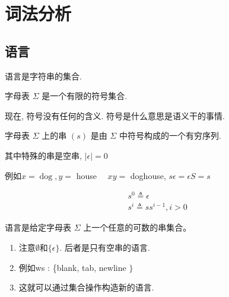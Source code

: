 \documentclass{ctexart}
\begin{document}
\section{词法分析}

\subsection{语言}

语言是字符串的集合. 

\begin{definition}[字母表]
    字母表 $\Sigma$ 是一个有限的符号集合. 
\end{definition}

现在, 符号没有任何的含义. 符号是什么意思是语义干的事情. 

\begin{definition}[字母表]
    字母表 $\Sigma$ 上的串 $(s)$ 是由 $\Sigma$ 中符号构成的一个有穷序列.
\end{definition}

其中特殊的串是空串, $|\epsilon|=0$

\begin{definition}[串上的连接运算]
    例如$x=\operatorname{dog}, y=$ house $\quad x y=$ doghouse, $s \epsilon=\epsilon S=s$
\end{definition}

\begin{definition}[串上的指数运算]
    $$
\begin{aligned}
&s^0 \triangleq \epsilon\\
&s^i \triangleq s s^{i-1}, i>0
\end{aligned}
$$
\end{definition}

\begin{definition}
    语言是给定字母表 $\Sigma$ 上一个任意的可数的串集合。
\end{definition}

\begin{remark}
    \begin{enumerate}
        \item 注意$\emptyset$和$\{\epsilon\}$. 后者是只有空串的语言. 
        \item 例如ws : \{blank, tab, newline $\}$
        \item 这就可以通过集合操作构造新的语言.
    \end{enumerate}
    
\end{remark}
\end{document}

